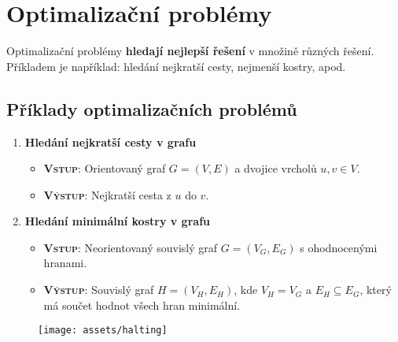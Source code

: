 \section{Optimalizační problémy}
Optimalizační problémy \textbf{hledají nejlepší řešení} v množině různých řešení. Příkladem je například: hledání nejkratší cesty, nejmenší kostry, apod.

\subsection{Příklady optimalizačních problémů}
\begin{enumerate}
    \item \textbf{Hledání nejkratší cesty v grafu}
          \begin{itemize}
              \item \textbf{\textsc{Vstup}}: Orientovaný graf $G = (V, E)$ a dvojice vrcholů $u, v \in V$.
              \item \textbf{\textsc{Výstup}}: Nejkratší cesta z $u$ do $v$.
          \end{itemize}
    \item \textbf{Hledání minimální kostry v grafu}
          \begin{itemize}
              \item \textbf{\textsc{Vstup}}: Neorientovaný souvislý graf $G = (V_G,E_G)$ s ohodnocenými hranami.
              \item \textbf{\textsc{Výstup}}: Souvislý graf $H = (V_H,E_H)$, kde $V_H = V_G$ a $E_H \subseteq E_G$, který má součet hodnot všech hran minimální.
          \end{itemize}
\end{enumerate}




\begin{figure}[H]
    \centering
    \texttt{[image: assets/halting]}
\end{figure}